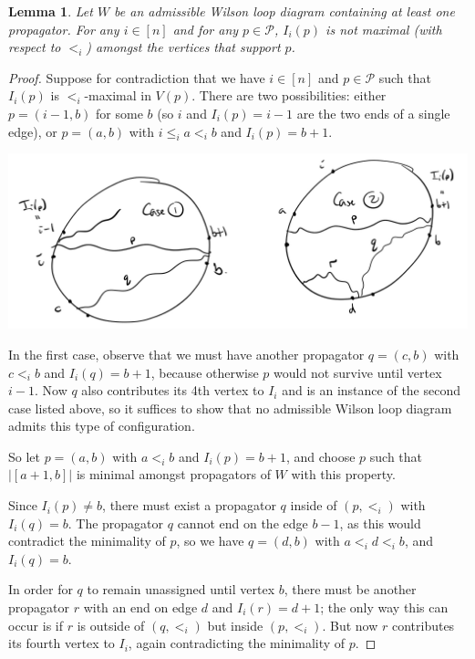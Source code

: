 \documentclass[11pt]{article}
\newcommand{\cP}{\mathcal{P}}
\newtheorem{lem}[thm]{Lemma}
\theoremstyle{remark}
\theoremstyle{definition}
\begin{document}
\begin{lem}\label{lem no fourth vertex}
Let $W$ be an admissible Wilson loop diagram containing at least one propagator. For any $i \in [n]$ and for any $p \in \cP$, $I_i(p)$ is not maximal (with respect to $<_i$) amongst the vertices that support $p$.
\end{lem}
\begin{proof}
Suppose for contradiction that we have $i \in [n]$ and $p \in \cP$ such that $I_i(p)$ is $<_i$-maximal in $V(p)$. There are two possibilities: either $p = (i-1,b)$ for some $b$ (so $i$ and $I_i(p) = i-1$ are the two ends of a single edge), or $p = (a,b)$ with $i\leq_i a <_i b$ and $I_i(p) = b+1$.

\includegraphics[width=15cm]{4th_vertex}

In the first case, observe that we must have another propagator $q = (c,b)$ with $c<_i b$ and $I_i(q) = b+1$, because otherwise $p$ would not survive until vertex $i-1$. Now $q$ also contributes its 4th vertex to $I_i$ and is an instance of the second case listed above, so it suffices to show that no admissible Wilson loop diagram admits this type of configuration.

So let $p = (a,b)$ with $a<_ib$ and $I_i(p) = b+1$, and choose $p$ such that $|[a+1,b]|$ is minimal amongst propagators of $W$ with this property.

Since $I_i(p) \neq b$, there must exist a propagator $q$ inside of $(p,<_i)$ with $I_i(q) = b$. The propagator $q$ cannot end on the edge $b-1$, as this would contradict the minimality of $p$, so we have $q = (d,b)$ with $a <_i d <_i b$, and $I_i(q) = b$. 

In order for $q$ to remain unassigned until vertex $b$, there must be another propagator $r$ with an end on edge $d$ and $I_i(r) = d+1$; the only way this can occur is if $r$ is outside of $(q,<_i)$ but inside $(p,<_i)$. But now $r$ contributes its fourth vertex to $I_i$, again contradicting the minimality of $p$.
\end{proof}
\end{document}
